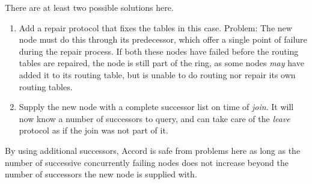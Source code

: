 There are at least two possible solutions here.

\begin{enumerate}
\item Add a repair protocol that fixes the tables in this case. Problem: The new node
 must do this through its predecessor, which offer a single point of failure during
 the repair process. If both these nodes have failed before the routing tables are
 repaired, the node is still part of the ring, as some nodes \emph{may} have added it to its
 routing table, but is unable to do routing nor repair its own routing tables.
\item Supply the new node with a complete successor list on time of \emph{join}. It
 will now know a number of successors to query, and can take care of the \emph{leave}
 protocol as if the join was not part of it.
\end{enumerate}

By using additional successors, Accord is safe from problems here as long as the
 number of successive concurrently failing nodes does not increase beyond the
 number of successors the new node is supplied with.
